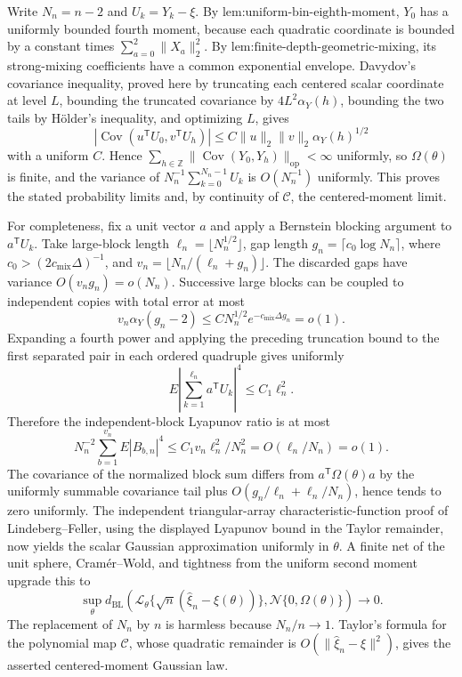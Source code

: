 Write \(N_n=n-2\) and \(U_k=Y_k-\xi\).  By \(\text{lem:uniform-bin-eighth-moment}\), \(Y_0\) has a uniformly bounded fourth moment, because each quadratic coordinate is bounded by a constant times \(\sum_{a=0}^2\|X_a\|_2^2\).  By \(\text{lem:finite-depth-geometric-mixing}\), its strong-mixing coefficients have a common exponential envelope.  Davydov's covariance inequality, proved here by truncating each centered scalar coordinate at level \(L\), bounding the truncated covariance by \(4L^2\alpha_Y(h)\), bounding the two tails by H\"older's inequality, and optimizing \(L\), gives
\[
 |\operatorname{Cov}(u^{\mathsf T}U_0,v^{\mathsf T}U_h)|
 \leq C\|u\|_2\|v\|_2\alpha_Y(h)^{1/2}
\]
with a uniform \(C\).  Hence \(\sum_{h\in\mathbb Z}\|\operatorname{Cov}(Y_0,Y_h)\|_{\mathrm{op}}<\infty\) uniformly, so \(\Omega(\theta)\) is finite, and the variance of \(N_n^{-1}\sum_{k=0}^{N_n-1}U_k\) is \(O(N_n^{-1})\) uniformly.  This proves the stated probability limits and, by continuity of \(\mathcal C\), the centered-moment limit.

For completeness, fix a unit vector \(a\) and apply a Bernstein blocking argument to \(a^{\mathsf T}U_k\).  Take large-block length \(\ell_n=\lfloor N_n^{1/2}\rfloor\), gap length \(g_n=\lceil c_0\log N_n\rceil\), where \(c_0>(2c_{\mathrm{mix}}\Delta)^{-1}\), and \(v_n=\lfloor N_n/(\ell_n+g_n)\rfloor\).  The discarded gaps have variance \(O(v_ng_n)=o(N_n)\).  Successive large blocks can be coupled to independent copies with total error at most
\[
 v_n\alpha_Y(g_n-2)\leq C N_n^{1/2}e^{-c_{\mathrm{mix}}\Delta g_n}=o(1).
\]
Expanding a fourth power and applying the preceding truncation bound to the first separated pair in each ordered quadruple gives uniformly
\[
 E\left|\sum_{k=1}^{\ell_n}a^{\mathsf T}U_k\right|^4\leq C_1\ell_n^2.
\]
Therefore the independent-block Lyapunov ratio is at most
\[
 N_n^{-2}\sum_{b=1}^{v_n}E|B_{b,n}|^4
 \leq C_1v_n\ell_n^2/N_n^2=O(\ell_n/N_n)=o(1).
\]
The covariance of the normalized block sum differs from \(a^{\mathsf T}\Omega(\theta)a\) by the uniformly summable covariance tail plus \(O(g_n/\ell_n+\ell_n/N_n)\), hence tends to zero uniformly.  The independent triangular-array characteristic-function proof of Lindeberg--Feller, using the displayed Lyapunov bound in the Taylor remainder, now yields the scalar Gaussian approximation uniformly in \(\theta\).  A finite net of the unit sphere, Cram\'er--Wold, and tightness from the uniform second moment upgrade this to
\[
 \sup_\theta d_{\mathrm{BL}}\!\left(\mathcal L_\theta\{\sqrt n(\widehat\xi_n-\xi(\theta))\},
 \mathcal N\{0,\Omega(\theta)\}\right)\to0.
\]
The replacement of \(N_n\) by \(n\) is harmless because \(N_n/n\to1\).  Taylor's formula for the polynomial map \(\mathcal C\), whose quadratic remainder is \(O(\|\widehat\xi_n-\xi\|^2)\), gives the asserted centered-moment Gaussian law.

